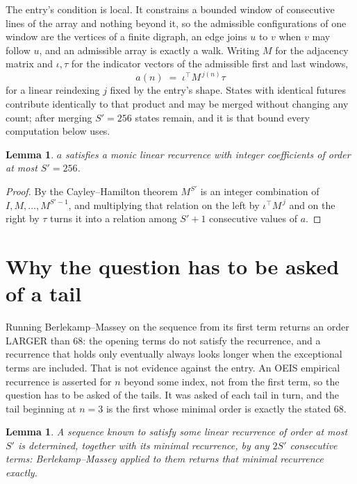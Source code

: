 \documentclass[11pt,a4paper]{article}
\theoremstyle{plain}
\newtheorem{lemma}[theorem]{Lemma}
\theoremstyle{definition}
\begin{document}
The entry's condition is local. It constrains a bounded window of consecutive lines of the
array and nothing beyond it, so the admissible configurations of one window are the vertices of
a finite digraph, an edge joins $u$ to $v$ when $v$ may follow $u$, and an admissible array is
exactly a walk. Writing $M$ for the adjacency matrix and $\iota,\tau$ for the indicator vectors
of the admissible first and last windows,
\[
a(n)\;=\;\iota^{\!\top}M^{\,j(n)}\tau
\]
for a linear reindexing $j$ fixed by the entry's shape. States with identical futures
contribute identically to that product and may be merged without changing any count; after
merging $S'=256$ states remain, and it is that bound every computation below uses.

\begin{lemma}\label{lem:cf}
$a$ satisfies a monic linear recurrence with integer coefficients of order at most $S'=256$.
\end{lemma}

\begin{proof}
By the Cayley--Hamilton theorem $M^{S'}$ is an integer combination of $I,M,\dots,M^{S'-1}$,
and multiplying that relation on the left by $\iota^{\!\top}M^{\,j}$ and on the right by
$\tau$ turns it into a relation among $S'+1$ consecutive values of $a$.
\end{proof}

\section{Why the question has to be asked of a tail}

Running Berlekamp--Massey on the sequence from its first term returns an order LARGER than $68$: the opening terms do not satisfy the recurrence, and a recurrence that holds only eventually always looks longer when the exceptional terms are included. That is not evidence against the entry. An OEIS empirical recurrence is asserted for $n$ beyond some index, not from the first term, so the question has to be asked of the tails. It was asked of each tail in turn, and the tail beginning at $n=3$ is the first whose minimal order is exactly the stated $68$.

\begin{lemma}\label{lem:bm}
A sequence known to satisfy some linear recurrence of order at most $S'$ is determined,
together with its minimal recurrence, by any $2S'$ consecutive terms: Berlekamp--Massey applied
to them returns that minimal recurrence exactly.
\end{lemma}
\end{document}
